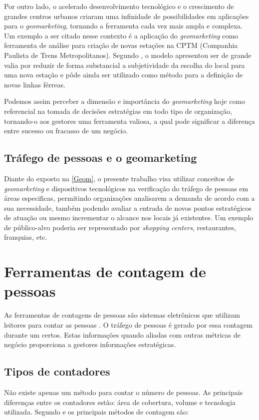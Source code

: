 Por outro lado, o acelerado desenvolvimento tecnológico e o crescimento de
grandes centros urbanos criaram uma infinidade de possibilidades em aplicações
para o \emph{geomarketing}, tornando a ferramenta cada vez mais ampla e
complexa. Um exemplo a ser citado nesse contexto é a aplicação do
\emph{geomarketing} como ferramenta de análise para criação de novas estações na
CPTM (Companhia Paulista de Trens Metropolitanos). Segundo
, o modelo apresentou ser de grande valia por reduzir de
forma substancial a subjetividade da escolha do local para uma nova estação e
pôde ainda ser utilizado como método para a definição de novas linhas férreas.

Podemos assim perceber a dimensão e importância do \emph{geomarketing} hoje como
referencial na tomada de decisões estratégias em todo tipo de organização,
tornando-o aos gestores uma ferramenta valiosa,  a qual pode significar a
diferença entre sucesso ou fracasso de um negócio.

\subsection{Tráfego de pessoas e o geomarketing}
Diante do exposto na \autoref{Geom}, o presente trabalho
visa utilizar conceitos de \emph{geomarketing} e dispositivos tecnológicos na
verificação do tráfego de pessoas em áreas especificas, permitindo organizações analisarem a
demanda de acordo com a sua necessidade, também podendo avaliar a entrada
de novos pontos estratégicos de atuação ou mesmo incrementar o alcance nos
locais já existentes. Um exemplo de público-alvo poderia ser representado por
\emph{shopping centers}, restaurantes, franquias, etc.

\section{Ferramentas de contagem de pessoas}
As ferramentas de contagens de pessoas
são sistemas eletrônicos que utilizam leitores para contar as pessoas
\cite{trafsysdef}. O tráfego de pessoas é gerado por essa contagem durante
um certos. Estas informações quando aliadas com outras métricas de
negócio proporciona a gestores informações estratégicas.

\subsection{Tipos de contadores}
Não existe apenas um método para contar o número de pessoas. As principais
diferenças entre os contadores estão: área de cobertura, volume e tecnologia
utilizada. Segundo  e  os principais métodos de
contagem são:

